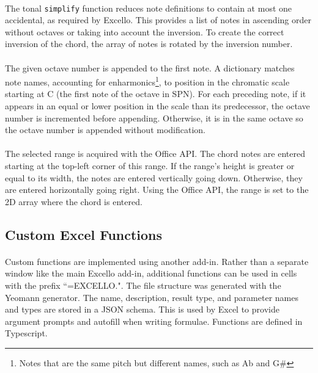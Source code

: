 \paragraph{} The tonal \texttt{simplify} function reduces note definitions to contain at most one accidental, as required by Excello. This provides a list of notes in ascending order without octaves or taking into account the inversion. To create the correct inversion of the chord, the array of notes is rotated by the inversion number.

\paragraph{} The given octave number is appended to the first note. A dictionary matches note names, accounting for enharmonics\footnote{Notes that are the same pitch but different names, such as Ab and G\#}, to position in the chromatic scale starting at C (the first note of the octave in SPN). For each preceding note, if it appears in an equal or lower position in the scale than its predecessor, the octave number is incremented before appending. Otherwise, it is in the same octave so the octave number is appended without modification.

\paragraph{} The selected range is acquired with the Office API. The chord notes are entered starting at the top-left corner of this range. If the range's height is greater or equal to its width, the notes are entered vertically going down. Otherwise, they are entered horizontally going right. Using the Office API, the range is set to the 2D array where the chord is entered.

\subsection{Custom Excel Functions}

\paragraph{} Custom functions are implemented using another add-in. Rather than a separate window like the main Excello add-in, additional functions can be used in cells with the prefix ``=EXCELLO.". The file structure was generated with the Yeomann generator. The name, description, result type, and parameter names and types are stored in a JSON schema. This is used by Excel to provide argument prompts and autofill when writing formulae. Functions are defined in Typescript.

